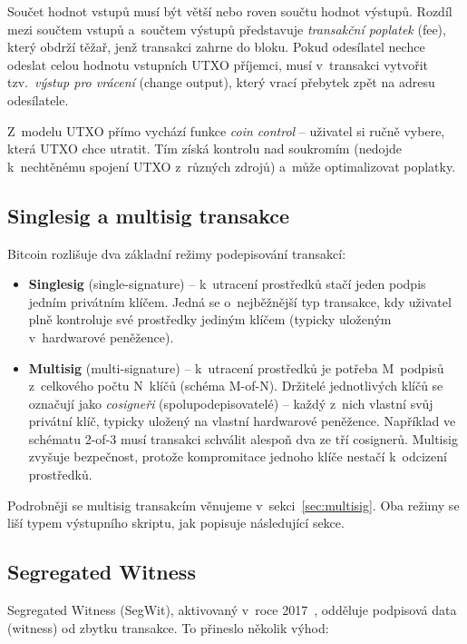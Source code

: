 Součet hodnot vstupů musí být větší nebo roven součtu hodnot výstupů. Rozdíl
mezi součtem vstupů a~součtem výstupů představuje \emph{transakční poplatek}
(fee), který obdrží těžař, jenž transakci zahrne do bloku. Pokud odesílatel
nechce odeslat celou hodnotu vstupních UTXO příjemci, musí v~transakci vytvořit
tzv.\ \emph{výstup pro vrácení} (change output), který vrací přebytek zpět
na adresu odesílatele.

Z~modelu UTXO přímo vychází funkce \emph{coin control} -- uživatel si ručně
vybere, která UTXO chce utratit. Tím získá kontrolu nad soukromím (nedojde
k~nechtěnému spojení UTXO z~různých zdrojů) a~může optimalizovat poplatky.

\subsection{Singlesig a multisig transakce}
\label{sec:singlesig-multisig}

Bitcoin rozlišuje dva základní režimy podepisování transakcí:

\begin{itemize}
  \item \textbf{Singlesig} (single-signature) -- k~utracení prostředků stačí
    jeden podpis jedním privátním klíčem. Jedná se o~nejběžnější typ transakce,
    kdy uživatel plně kontroluje své prostředky jediným klíčem (typicky
    uloženým v~hardwarové peněžence).
  \item \textbf{Multisig} (multi-signature) -- k~utracení prostředků je
    potřeba M~podpisů z~celkového počtu N~klíčů (schéma M-of-N). Držitelé
    jednotlivých klíčů se označují jako \emph{cosigneři} (spolupodepisovatelé)
    -- každý z~nich vlastní svůj privátní klíč, typicky uložený na vlastní
    hardwarové peněžence. Například ve schématu 2-of-3 musí transakci schválit
    alespoň dva ze tří cosignerů. Multisig zvyšuje bezpečnost, protože
    kompromitace jednoho klíče nestačí k~odcizení prostředků.
\end{itemize}

\noindent
Podrobněji se multisig transakcím věnujeme v~sekci~\ref{sec:multisig}.
Oba režimy se liší typem výstupního skriptu, jak popisuje následující sekce.

\subsection{Segregated Witness}
\label{sec:segwit}

Segregated Witness (SegWit), aktivovaný v~roce 2017~\citep{BIP141}, odděluje
podpisová data (witness) od zbytku transakce. To přineslo několik výhod:

